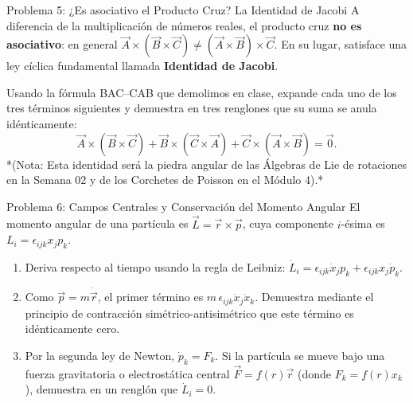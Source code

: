 \documentclass[11pt,letterpaper]{article}
\begin{document}
\begin{infobox}{Problema 5: ¿Es asociativo el Producto Cruz? La Identidad de Jacobi}
A diferencia de la multiplicación de números reales, el producto cruz \textbf{no es asociativo}: en general $\vec{A}\times(\vec{B}\times\vec{C}) \neq (\vec{A}\times\vec{B})\times\vec{C}$. En su lugar, satisface una ley cíclica fundamental llamada \textbf{Identidad de Jacobi}.

Usando la fórmula BAC--CAB que demolimos en clase, expande cada uno de los tres términos siguientes y demuestra en tres renglones que su suma se anula idénticamente:
\[
\vec{A}\times(\vec{B}\times\vec{C}) + \vec{B}\times(\vec{C}\times\vec{A}) + \vec{C}\times(\vec{A}\times\vec{B}) = \vec{0}.
\]
*(Nota: Esta identidad será la piedra angular de las Álgebras de Lie de rotaciones en la Semana 02 y de los Corchetes de Poisson en el Módulo 4).*
\end{infobox}


\begin{infobox}{Problema 6: Campos Centrales y Conservación del Momento Angular}
El momento angular de una partícula es $\vec{L} = \vec{r} \times \vec{p}$, cuya componente $i$-ésima es $L_i = \epsilon_{ijk} x_j p_k$.
\begin{enumerate}[label=(\alph*)]
    \item Deriva respecto al tiempo usando la regla de Leibniz: $\dot{L}_i = \epsilon_{ijk} \dot{x}_j p_k + \epsilon_{ijk} x_j \dot{p}_k$.
    \item Como $\vec{p} = m\dot{\vec{r}}$, el primer término es $m\,\epsilon_{ijk} \dot{x}_j \dot{x}_k$. Demuestra mediante el principio de contracción simétrico-antisimétrico que este término es idénticamente cero.
    \item Por la segunda ley de Newton, $\dot{p}_k = F_k$. Si la partícula se mueve bajo una fuerza gravitatoria o electrostática central $\vec{F} = f(r)\vec{r}$ (donde $F_k = f(r)x_k$), demuestra en un renglón que $\dot{L}_i = 0$.
\end{enumerate}
\end{infobox}
\end{document}
